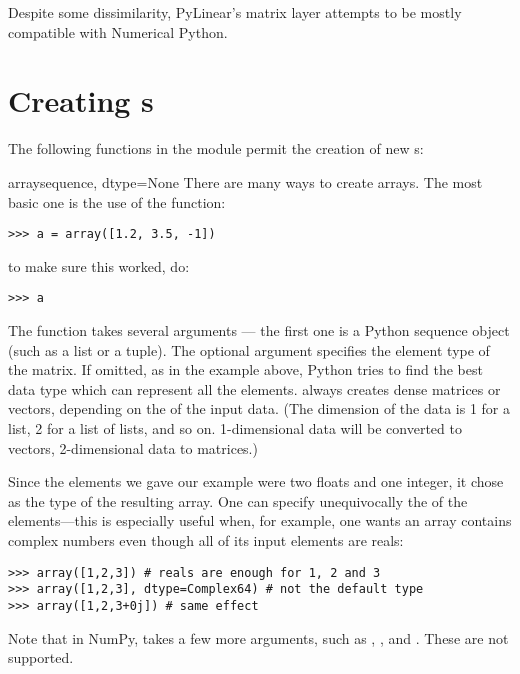 Despite some dissimilarity, PyLinear's matrix layer attempts to be
mostly compatible with Numerical Python.

\section{Creating s}

The following functions in the module  permit
the creation of new s:

\begin{funcdesc}{array}{sequence, dtype=None}
   There are many ways to create arrays. The most basic one is the use of the
    function:
\begin{verbatim}
>>> a = array([1.2, 3.5, -1])
\end{verbatim}
   to make sure this worked, do:
\begin{verbatim}
>>> a
\end{verbatim}
   The  function takes several arguments --- the first
   one is a Python sequence object (such as a list or a tuple).  The
   optional argument  specifies the element type of the
   matrix. If omitted, as in the example above, Python tries to find
   the best data type which can represent all the
   elements.  always creates dense matrices or
   vectors, depending on the  of
   the input data.  (The dimension of the data is 1 for a list, 2 for
   a list of lists, and so on.  1-dimensional data will be converted
   to vectors, 2-dimensional data to matrices.)
   
   Since the elements we gave our example were two floats and one integer, it
   chose  as the type of the resulting array. One can specify
   unequivocally the  of the elements---this is especially 
   useful when, for example, one wants an array contains complex numbers even
   though all of its input elements are reals:
\begin{verbatim}
>>> array([1,2,3]) # reals are enough for 1, 2 and 3
>>> array([1,2,3], dtype=Complex64) # not the default type
>>> array([1,2,3+0j]) # same effect
\end{verbatim}
    Note that in NumPy,  takes a few more arguments, such as
    , , and . These are not supported.
\end{funcdesc}

